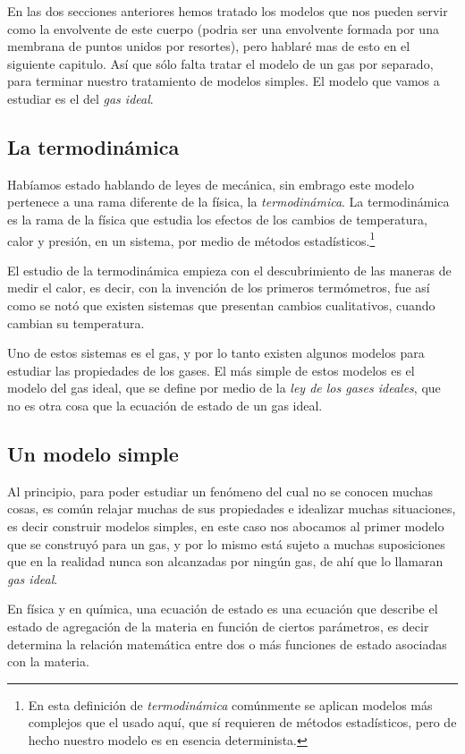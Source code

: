 En las dos secciones anteriores hemos tratado los modelos que nos pueden servir como la envolvente de este cuerpo (podria ser una envolvente formada por una membrana de puntos unidos por resortes), pero hablaré mas de esto en el siguiente capitulo.
Así que sólo falta tratar el modelo de un gas por separado, para terminar nuestro tratamiento de modelos simples.
El modelo que vamos a estudiar es el del \emph{gas ideal}.

\subsection{La termodinámica}

Habíamos estado hablando de leyes de mecánica, sin embrago este modelo pertenece a una rama diferente de la física, la \emph{termodinámica}.
La termodinámica es la rama de la física que estudia los efectos de los cambios de temperatura, calor y presión, en un sistema, por medio de métodos estadísticos.\footnote{En esta definición de \emph{termodinámica} comúnmente se aplican modelos más complejos que el usado aquí, que sí requieren de métodos estadísticos, pero de hecho nuestro modelo es en esencia determinista.}

El estudio de la termodinámica empieza con el descubrimiento de las maneras de medir el calor, es decir, con la invención de los primeros termómetros, fue así como se notó que existen sistemas que presentan cambios cualitativos, cuando cambian su temperatura.

Uno de estos sistemas es el gas, y por lo tanto existen algunos modelos para estudiar las propiedades de los gases.
El más simple de estos modelos es el modelo del gas ideal, que se define por medio de la \emph{ley de los gases ideales}, que no es otra cosa que la ecuación de estado de un gas ideal.

\subsection{Un modelo simple}

Al principio, para poder estudiar un fenómeno del cual no se conocen muchas cosas, es común relajar muchas de sus propiedades e idealizar muchas situaciones, es decir construir modelos simples, en este caso nos abocamos al primer modelo que se construyó para un gas, y por lo mismo está sujeto a muchas suposiciones que en la realidad nunca son alcanzadas por ningún gas, de ahí que lo llamaran \emph{gas ideal}.

En física y en química, una ecuación de estado es una ecuación que describe el estado de agregación de la materia en función de ciertos parámetros, es decir determina la relación matemática entre dos o más funciones de estado asociadas con la materia.

